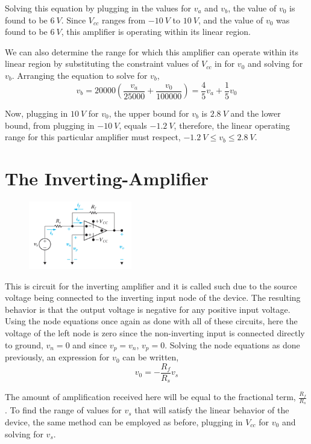 \documentclass[12pt]{article}
\begin{document}
    \par Solving this equation by plugging in the values for $v_a$ and $v_b$,
    the value of $v_0$ is found to be $6\ V$. Since $V_{cc}$ ranges from $-10\
    V$ to $10\ V$, and the value of $v_0$ was found to be $6\ V$, this amplifier
    is operating within its linear region.
    \par We can also determine the range for which this amplifier can operate
    within its linear region by substituting the constraint values of $V_{cc}$
    in for $v_0$ and solving for $v_b$. Arranging the equation to solve for
    $v_b$,
    \[
        v_b = 20000(\frac{v_a}{25000} + \frac{v_0}{100000}) =\frac{4}{5}v_a +
        \frac{1}{5}v_0
    \]
    \par Now, plugging in $10\ V$ for $v_0$, the upper bound for $v_b$ is $2.8\
    V$ and the lower bound, from plugging in $-10\ V$, equals $-1.2\ V$,
    therefore, the linear operating range for this particular amplifier must
    respect, $-1.2\ V \le v_b \le 2.8\ V$.
    \section*{The Inverting-Amplifier}
    \begin{figure}[h]
        \centering
        \includegraphics[width=0.4\textwidth]{Inverting Amplifier.png}
    \end{figure}
    \par This is circuit for the inverting amplifier and it is called such due
    to the source voltage being connected to the inverting input node of the
    device. The resulting behavior is that the output voltage is negative for
    any positive input voltage. Using the node equations once again as done with
    all of these circuits, here the voltage of the left node is zero since the
    non-inverting input is connected directly to ground, $v_n = 0$ and since
    $v_p = v_n$, $v_p = 0$. Solving the node equations as done previously, an
    expression for $v_0$ can be written,
    \[
        v_0 = -\frac{R_f}{R_s}v_s
    \]
    \par The amount of amplification received here will be equal to the
    fractional term, $\frac{R_f}{R_s}$. To find the range of values for $v_s$
    that will satisfy the linear behavior of the device, the same method can be
    employed as before, plugging in $V_{cc}$ for $v_0$ and solving for $v_s$.
\end{document}
